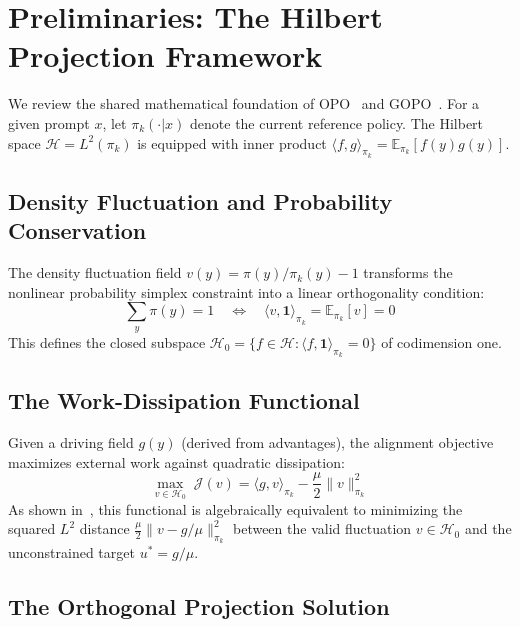 \documentclass[11pt]{article}
\theoremstyle{definition}
\theoremstyle{remark}
\newcommand{\E}{\mathbb{E}}
\newcommand{\pik}{\pi_k}
\begin{document}
\section{Preliminaries: The Hilbert Projection Framework}
\label{sec:prelim}

We review the shared mathematical foundation of OPO~\cite{Wang2025OPO} and GOPO~\cite{Wang2025GOPO}. For a given prompt $x$, let $\pik(\cdot|x)$ denote the current reference policy. The Hilbert space $\mathcal{H} = L^2(\pik)$ is equipped with inner product $\langle f, g \rangle_{\pik} = \E_{\pik}[f(y)g(y)]$.

\subsection{Density Fluctuation and Probability Conservation}

The density fluctuation field $v(y) = \pi(y)/\pik(y) - 1$ transforms the nonlinear probability simplex constraint into a linear orthogonality condition:
\begin{equation}
\label{eq:conservation}
    \sum_y \pi(y) = 1 \quad \Longleftrightarrow \quad \langle v, \mathbf{1}\rangle_{\pik} = \E_{\pik}[v] = 0
\end{equation}
This defines the closed subspace $\mathcal{H}_0 = \{f \in \mathcal{H} : \langle f, \mathbf{1}\rangle_{\pik} = 0\}$ of codimension one.

\subsection{The Work-Dissipation Functional}

Given a driving field $g(y)$ (derived from advantages), the alignment objective maximizes external work against quadratic dissipation:
\begin{equation}
\label{eq:work_diss}
    \max_{v \in \mathcal{H}_0}\; \mathcal{J}(v) = \langle g, v \rangle_{\pik} - \frac{\mu}{2}\|v\|^2_{\pik}
\end{equation}
As shown in~\cite{Wang2025GOPO}, this functional is algebraically equivalent to minimizing the squared $L^2$ distance $\frac{\mu}{2}\|v - g/\mu\|^2_{\pik}$ between the valid fluctuation $v \in \mathcal{H}_0$ and the unconstrained target $u^* = g/\mu$.

\subsection{The Orthogonal Projection Solution}
\end{document}
